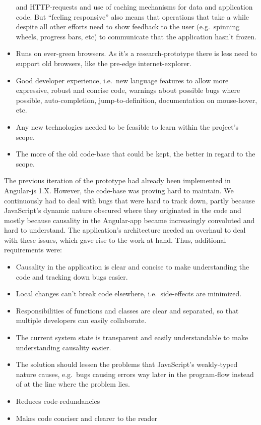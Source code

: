 \documentclass[a4paper,,tablecaptionabove]{scrbook}
\providecommand{\tightlist}{%
  \setlength{\itemsep}{0pt}\setlength{\parskip}{0pt}}
\begin{document}
\begin{itemize}
  and HTTP-requests and use of caching mechanisms for data and
  application code. But \enquote{feeling responsive} also means that
  operations that take a while despite all other efforts need to show
  feedback to the user (e.g.~spinning wheels, progress bars, etc) to
  communicate that the application hasn't frozen.
\item
  Runs on ever-green browsers. As it's a research-prototype there is
  less need to support old browsers, like the pre-edge
  internet-explorer.
\item
  Good developer experience, i.e.~new language features to allow more
  expressive, robust and concise code, warnings about possible bugs
  where possible, auto-completion, jump-to-definition, documentation on
  mouse-hover, etc.
\item
  Any new technologies needed to be feasible to learn within the
  project's scope.
\item
  The more of the old code-base that could be kept, the better in regard
  to the scope.
\end{itemize}

The previous iteration of the prototype had already been implemented in
Angular-js 1.X. However, the code-base was proving hard to maintain. We
continuously had to deal with bugs that were hard to track down, partly
because JavaScript's dynamic nature obscured where they originated in
the code and mostly because causality in the Angular-app became
increasingly convoluted and hard to understand. The application's
architecture needed an overhaul to deal with these issues, which gave
rise to the work at hand. Thus, additional requirements were:

\begin{itemize}
\tightlist
\item
  Causality in the application is clear and concise to make
  understanding the code and tracking down bugs easier.
\item
  Local changes can't break code elsewhere, i.e.~side-effects are
  minimized.
\item
  Responsibilities of functions and classes are clear and separated, so
  that multiple developers can easily collaborate.
\item
  The current system state is transparent and easily understandable to
  make understanding causality easier.
\item
  The solution should lessen the problems that JavaScript's weakly-typed
  nature causes, e.g.~bugs causing errors way later in the program-flow
  instead of at the line where the problem lies.
\item
  Reduces code-redundancies
\item
  Makes code conciser and clearer to the reader
\end{itemize}
\end{document}
